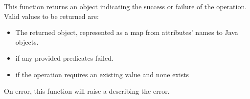 This function returns an object indicating the success or failure of the
operation.  Valid values to be returned are:

\begin{itemize}[noitemsep]
\item The returned object, represented as a map from attributes' names to Java
    objects.
\item {} if any provided predicates failed.
\item {} if the operation requires an existing value and none exists
\end{itemize}

On error, this function will raise a  describing
the error.
